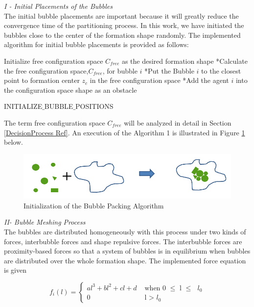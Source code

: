 \textit{			I - Initial Placements of the Bubbles} \\ 
The initial bubble placements are important because it will greatly reduce the convergence time of the partitioning process. In this work, we have initiated the bubbles close to the center of the formation shape randomly. The implemented algorithm for initial bubble placements is provided as follows:
			
\begin{algorithm}[H]
Initialize free configuration space $C_{free}$ as the desired formation shape \newline
{}
{		
*Calculate the free configuration space,$C_{free}$, for bubble $i$\;
*Put the Bubble $i$ to the closest point to  formation center  $z_c$  in the free configuration space\;
*Add the agent $i$ into the configuration space shape as an obstacle \;
}\		
\caption{INITIALIZE$\_$BUBBLE$\_$POSITIONS}
\end{algorithm}
		
The term free configuration space $C_{free}$ will be analyzed in detail in Section \ref{DecisionProcess Ref}. An execution of the Algorithm 1 is illustrated in Figure \ref{algorithm1_ref} below.
		
\begin{figure}[H]
\caption{Initialization of the Bubble Packing Algorithm} \label{algorithm1_ref}
\centering
\includegraphics[scale = 0.50]{bubble_packing}
\end{figure}
				
\textit{			II- Bubble Meshing Process } \\ 
The bubbles are distributed homogeneously with this process under two kinds of forces, interbubble forces and shape repulsive forces. The interbubble forces are proximity-based forces so that a system of bubbles is in equilibrium when bubbles are distributed over the whole formation shape. The implemented force equation is given
		
\begin{equation}
f_i(l) = \left\{ \begin{array}{rl}
al^3 + bl^2 + cl + d &\mbox{ when 0 $\leq$ l $\leq$ $l_0$} \\
0                               &\mbox{ l > $l_0$}
\end{array} \right.
\end{equation}

